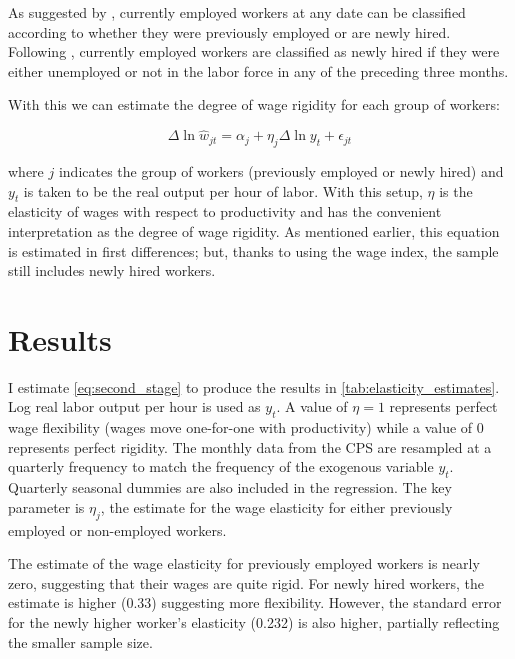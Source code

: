 \documentclass[11pt]{article}
\begin{document}
As suggested by \cite{pissarides_2009}, currently employed workers at any date can be classified according to whether they were previously employed or are newly hired.
Following \cite{haefke_sonntag_vanRens_2013}, currently employed workers are classified as newly hired if they were either unemployed or not in the labor force in any of the preceding three months.

With this we can estimate the degree of wage rigidity for each group of workers:

\begin{equation}
    \label{eq:second_stage}
    \Delta \ln \hat{w}_{jt} = \alpha_j + \eta_j \Delta \ln y_t + \epsilon_{jt}
\end{equation}

where $j$ indicates the group of workers (previously employed or newly hired) and $y_t$ is taken to be the real output per hour of labor.
With this setup, $\eta$ is the elasticity of wages with respect to productivity and has the convenient interpretation as the degree of wage rigidity.
As mentioned earlier, this equation is estimated in first differences;
but, thanks to using the wage index, the sample still includes newly hired workers.


\section{Results}
\label{sec:results}

I estimate \autoref{eq:second_stage} to produce the results in \autoref{tab:elasticity_estimates}.
Log real labor output per hour is used as $y_t$.
A value of $\eta = 1$ represents perfect wage flexibility (wages move one-for-one with productivity) while a value of 0 represents perfect rigidity.
The monthly data from the CPS are resampled at a quarterly frequency to match the frequency of the exogenous variable $y_t$.
Quarterly seasonal dummies are also included in the regression.
The key parameter is $\eta_j$, the estimate for the wage elasticity for either previously employed or non-employed workers.

The estimate of the wage elasticity for previously employed workers is nearly zero, suggesting that their wages are quite rigid.
For newly hired workers, the estimate is higher (0.33) suggesting more flexibility.
However, the standard error for the newly higher worker's elasticity (0.232) is also higher, partially reflecting the smaller sample size.
\end{document}
